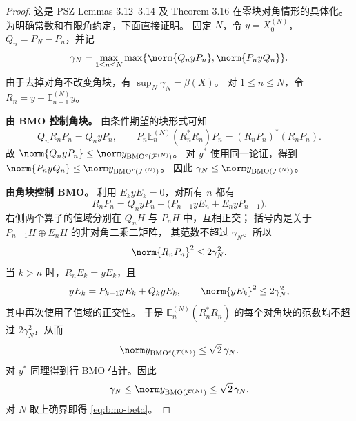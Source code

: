 \begin{proof}
这是 PSZ Lemmas 3.12--3.14 及 Theorem 3.16 在零块对角情形的具体化。
为明确常数和有限角约定，下面直接证明。
固定 $N$，令 $y=X_0^{(N)}$，$Q_n=P_N-P_n$，并记
\[
 \gamma_N=\max_{1\leq n\leq N}\max\{
   \norm{Q_nyP_n},\norm{P_nyQ_n}\}.
\]
由于去掉对角不改变角块，有 $\sup_N\gamma_N=\beta(X)$。
对 $1\leq n\leq N$，令 $R_n=y-\mathbb E_{n-1}^{(N)}y$。

\medskip
\textbf{由 BMO 控制角块。}
由条件期望的块形式可知
\[
 Q_nR_nP_n=Q_nyP_n,\qquad
 P_n\mathbb E_n^{(N)}(R_n^*R_n)P_n
   =(R_nP_n)^*(R_nP_n).
\]
故 $\norm{Q_nyP_n}\leq\norm y_{\mathrm{BMO}^{c}(\mathcal F^{(N)})}$。
对 $y^*$ 使用同一论证，得到
$\norm{P_nyQ_n}\leq\norm y_{\mathrm{BMO}^{r}(\mathcal F^{(N)})}$。
因此 $\gamma_N\leq\norm y_{\mathrm{BMO}(\mathcal F^{(N)})}$。

\medskip
\textbf{由角块控制 BMO。}
利用 $E_kyE_k=0$，对所有 $n$ 都有
\[
 R_nP_n=Q_nyP_n+
       \bigl(P_{n-1}yE_n+E_nyP_{n-1}\bigr).
\]
右侧两个算子的值域分别在 $Q_nH$ 与 $P_nH$ 中，互相正交；
括号内是关于 $P_{n-1}H\oplus E_nH$ 的非对角二乘二矩阵，
其范数不超过 $\gamma_N$。所以
\[
 \norm{R_nP_n}^{2}\leq2\gamma_N^2.
\]
当 $k>n$ 时，$R_nE_k=yE_k$，且
\[
 yE_k=P_{k-1}yE_k+Q_kyE_k,
 \qquad \norm{yE_k}^{2}\leq2\gamma_N^2,
\]
其中再次使用了值域的正交性。
于是 $\mathbb E_n^{(N)}(R_n^*R_n)$ 的每个对角块的范数均不超过
$2\gamma_N^2$，从而
\[
 \norm y_{\mathrm{BMO}^{c}(\mathcal F^{(N)})}
 \leq\sqrt2\,\gamma_N.
\]
对 $y^*$ 同理得到行 BMO 估计。因此
\[
 \gamma_N\leq\norm y_{\mathrm{BMO}(\mathcal F^{(N)})}
       \leq\sqrt2\,\gamma_N.
\]
对 $N$ 取上确界即得 \eqref{eq:bmo-beta}。
\end{proof}
